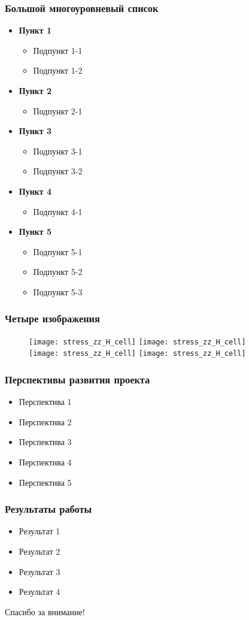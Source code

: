 \documentclass[14pt]{beamer}
\newcommand{\itemi}{\item[\checkmark]}
\begin{document}
\begin{frame}
\frametitle{Большой многоуровневый список}
\begin{itemize}
  \item \textbf{Пункт 1}
    \begin{itemize}
      \itemi Подпункт 1-1
      \itemi Подпункт 1-2
    \end{itemize}
  \item \textbf{Пункт 2}
    \begin{itemize}
      \itemi Подпункт 2-1
    \end{itemize}
  \item \textbf{Пункт 3}
    \begin{itemize}
      \itemi Подпункт 3-1
      \itemi Подпункт 3-2
    \end{itemize}
  \item \textbf{Пункт 4}
    \begin{itemize}
      \itemi Подпункт 4-1
    \end{itemize}
  \item \textbf{Пункт 5}
    \begin{itemize}
      \itemi Подпункт 5-1
      \itemi Подпункт 5-2
      \itemi Подпункт 5-3
    \end{itemize}
\end{itemize}
\end{frame}

\begin{frame}
\frametitle{Четыре изображения}
\begin{figure}[H]
  \center
    \texttt{[image: stress\_zz\_H\_cell]}
    \texttt{[image: stress\_zz\_H\_cell]}\\
    \texttt{[image: stress\_zz\_H\_cell]}
    \texttt{[image: stress\_zz\_H\_cell]}
\end{figure}
\end{frame}

\begin{frame}
\frametitle{Перспективы развития проекта}
\begin{itemize}
  \item Перспектива 1
  \item Перспектива 2
  \item Перспектива 3
  \item Перспектива 4
  \item Перспектива 5
\end{itemize}
\end{frame}

\begin{frame}
\frametitle{Результаты работы}
\begin{itemize}
  \item Результат 1
  \item Результат 2
  \item Результат 3
  \item Результат 4
\end{itemize}
\end{frame}

\begin{frame}
\begin{center}
Спасибо за внимание!
\end{center}
\end{frame}
\end{document}
